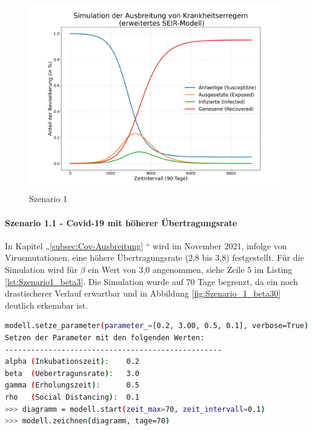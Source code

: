 \documentclass[12pt]{article}
\begin{document}
\begin{figure}[H]
\centering
\includegraphics[scale=0.4]{Szenario_1}
\caption{Szenario 1}
\label{fig:szenario_1}
\end{figure}

\paragraph{Szenario 1.1 - Covid-19 mit höherer Übertragungsrate}
In Kapitel „\ref{subsec:Cov-Ausbreitung} “ wird im November 2021, infolge von Virusmutationen, eine höhere Übertragungsrate (2,8 bis 3,8) festgestellt. Für die Simulation wird für $\beta$ ein Wert von 3,0 angenommen, siehe Zeile 5 im Listing \ref{lst:Szenario1_beta3}. Die Simulation wurde auf 70 Tage begrenzt, da ein noch drastischerer Verlauf erwartbar und in Abbildung \ref{fig:Szenario_1_beta30} deutlich erkennbar ist.

\begin{lstlisting}[language=Bash, caption=Szenario 1 - Covid-19 (hohe Übertragungsrate)), label=lst:Szenario1_beta3]
modell.setze_parameter(parameter_=[0.2, 3.00, 0.5, 0.1], verbose=True)
Setzen der Parameter mit den folgenden Werten:
--------------------------------------------------
alpha (Inkubationszeit):    0.2
beta  (Uebertragunsrate):   3.0
gamma (Erholungszeit):      0.5
rho   (Social Distancing):  0.1
>>> diagramm = modell.start(zeit_max=70, zeit_intervall=0.1)
>>> modell.zeichnen(diagramm, tage=70)
\end{lstlisting}
\end{document}

